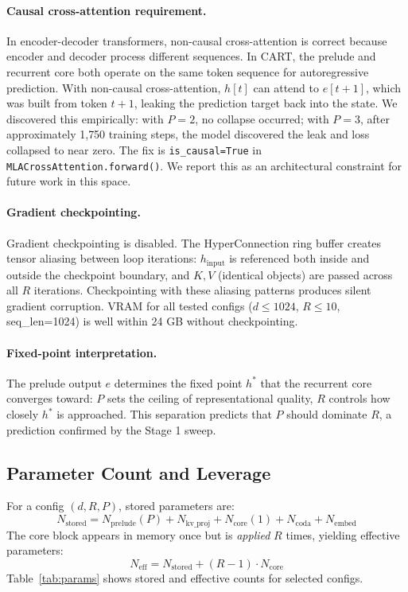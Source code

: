 \documentclass{article}
\newcommand{\cart}{\textsc{CART}}
\begin{document}
\paragraph{Causal cross-attention requirement.}
In encoder-decoder transformers, non-causal cross-attention is correct because encoder and decoder process different sequences. In \cart{}, the prelude and recurrent core both operate on the same token sequence for autoregressive prediction. With non-causal cross-attention, $h[t]$ can attend to $e[t+1]$, which was built from token $t+1$, leaking the prediction target back into the state. We discovered this empirically: with $P=2$, no collapse occurred; with $P=3$, after approximately 1{,}750 training steps, the model discovered the leak and loss collapsed to near zero. The fix is \texttt{is\_causal=True} in \texttt{MLACrossAttention.forward()}. We report this as an architectural constraint for future work in this space.

\paragraph{Gradient checkpointing.}
Gradient checkpointing is disabled. The HyperConnection ring buffer creates tensor aliasing between loop iterations: $h_\text{input}$ is referenced both inside and outside the checkpoint boundary, and $K, V$ (identical objects) are passed across all $R$ iterations. Checkpointing with these aliasing patterns produces silent gradient corruption. VRAM for all tested configs ($d \leq 1024$, $R \leq 10$, seq\_len=1024) is well within 24 GB without checkpointing.

\paragraph{Fixed-point interpretation.}
The prelude output $e$ determines the fixed point $h^*$ that the recurrent core converges toward: $P$ sets the ceiling of representational quality, $R$ controls how closely $h^*$ is approached. This separation predicts that $P$ should dominate $R$, a prediction confirmed by the Stage 1 sweep.

\subsection{Parameter Count and Leverage}

For a config $(d, R, P)$, stored parameters are:
\[
N_\text{stored} = N_\text{prelude}(P) + N_\text{kv\_proj} + N_\text{core}(1) + N_\text{coda} + N_\text{embed}
\]
The core block appears in memory once but is \emph{applied} $R$ times, yielding effective parameters:
\[
N_\text{eff} = N_\text{stored} + (R-1) \cdot N_\text{core}
\]
Table~\ref{tab:params} shows stored and effective counts for selected configs.
\end{document}
